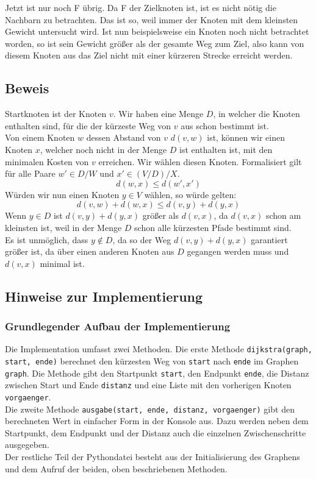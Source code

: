 \documentclass[12pt]{article}
\def\code#1{\texttt{#1}}
\begin{document}
		Jetzt ist nur noch F übrig. Da F der Zielknoten ist, ist es nicht nötig die Nachbarn zu betrachten. Das ist so, weil immer der Knoten mit dem kleinsten Gewicht untersucht wird. Ist nun beispielsweise ein Knoten noch nicht betrachtet worden, so ist sein Gewicht größer als der gesamte Weg zum Ziel, also kann von diesem Knoten aus das Ziel nicht mit einer kürzeren Strecke erreicht werden.\\

	\subsection{Beweis}
		Startknoten ist der Knoten $v$. Wir haben eine Menge $D$, in welcher die Knoten enthalten sind, für die der kürzeste Weg von $v$ aus schon bestimmt ist.\\
		Von einem Knoten $w$ dessen Abstand von $v$ $d(v, w)$ ist, können wir einen Knoten $x$, welcher noch nicht in der Menge $D$ ist enthalten ist, mit den minimalen Kosten von $v$ erreichen. Wir wählen diesen Knoten. Formalisiert gilt für alle Paare $w'\in D/W$ und $x'\in (V/D)/X$.
		$$d(w,x)\leq d(w',x')$$
		Würden wir nun einen Knoten $y\in V$ wählen, so würde gelten:
		$$d(v,w)+d(w,x)\leq d(v,y)+d(y,x)$$
		Wenn $y\in D$ ist $d(v,y)+d(y,x)$ größer als $d(v,x)$, da $d(v,x)$ schon am kleinsten ist, weil in der Menge $D$ schon alle kürzesten Pfade bestimmt sind.\\
		Es ist unmöglich, dass $y\notin D$, da so der Weg $d(v,y)+d(y,x)$ garantiert größer ist, da über einen anderen Knoten aus $D$ gegangen werden muss und $d(v,x)$ minimal ist.
		\cite{dijkstrabeweis}
	
	\subsection{Hinweise zur Implementierung}
		\subsubsection{Grundlegender Aufbau der Implementierung}
			Die Implementation umfasst zwei Methoden. Die erste Methode \code{dijkstra(graph, start, ende)} berechnet den kürzesten Weg von \code{start} nach \code{ende} im Graphen \code{graph}. Die Methode gibt den Startpunkt \code{start}, den Endpunkt \code{ende}, die Distanz zwischen Start und Ende \code{distanz} und eine Liste mit den vorherigen Knoten \code{vorgaenger}.\\
			Die zweite Methode \code{ausgabe(start, ende, distanz, vorgaenger)} gibt den berechneten Wert in einfacher Form in der Konsole aus. Dazu werden neben dem Startpunkt, dem Endpunkt und der Distanz auch die einzelnen Zwischenschritte ausgegeben.\\
			Der restliche Teil der Pythondatei besteht aus der Initialisierung des Graphens und dem Aufruf der beiden, oben beschriebenen Methoden.\\ 
			
\end{document}
